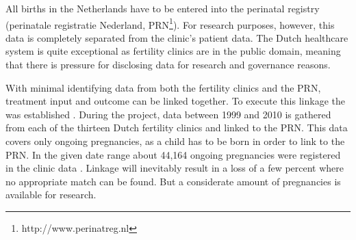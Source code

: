 All births in the Netherlands have to be entered into the perinatal registry (perinatale registratie Nederland, PRN\footnote{http://www.perinatreg.nl}).
For research purposes, however, this data is completely separated from the clinic's patient data.
The Dutch healthcare system is quite exceptional as fertility clinics are in the public domain, 
meaning that there is pressure for disclosing  data for research and governance reasons.

With minimal identifying data from both the fertility clinics and the PRN, treatment input and outcome can be linked together.
To execute this linkage the \project{} was established \silvia{[reference?]}.
During the project, data between 1999 and 2010 is gathered from each of the thirteen Dutch fertility clinics and linked to the PRN.
This data covers only ongoing pregnancies, as a child has to be born in order to link to the PRN.
In the given date range about 44,164 ongoing pregnancies were registered in the clinic data \cite{ivfReportNVOG}.
Linkage will inevitably result in a loss of a few percent where no appropriate match can be found.
But a considerate amount of pregnancies is available for research.

